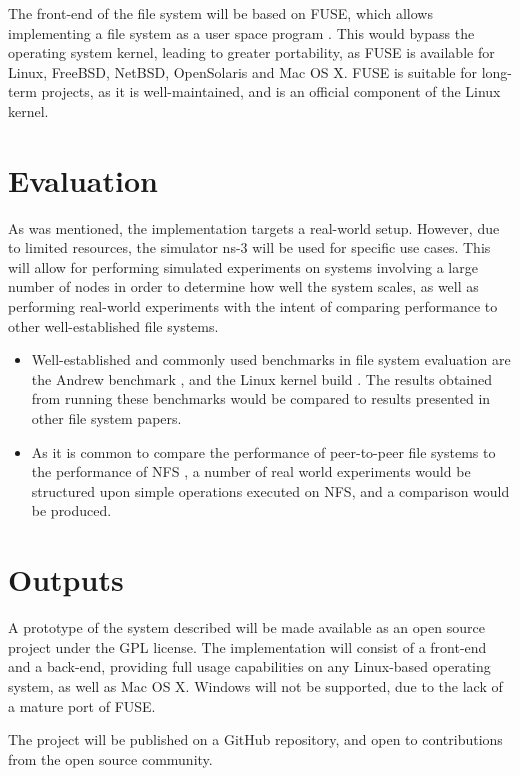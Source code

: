 \documentclass[8pt,a4paper]{article}
\begin{document}
The front-end of the file system will be based on FUSE, which allows implementing a file system as a user space program \cite{fuse}. This would bypass the operating system kernel, leading to greater portability, as FUSE is available for Linux, FreeBSD, NetBSD, OpenSolaris and Mac OS X. FUSE is suitable for long-term projects, as it is well-maintained, and is an official component of the Linux kernel.

\section{Evaluation}

As was mentioned, the implementation targets a real-world setup. However, due to limited resources, the simulator ns-3 \cite{ns3} will be used for specific use cases. This will allow for performing simulated experiments on systems involving a large number of nodes in order to determine how well the system scales, as well as performing real-world experiments with the intent of comparing performance to other well-established file systems.

\begin{itemize}
\item Well-established and commonly used benchmarks in file system evaluation are the Andrew benchmark \cite{andrew}, and the Linux kernel build \cite{kernelb}. The results obtained from running these benchmarks would be compared to results presented in other file system papers.

\item As it is common to compare the performance of peer-to-peer file systems to the performance of NFS \cite{oceanstore} \cite{ivy} \cite{pastis}, a number of real world experiments would be structured upon simple operations executed on NFS, and a comparison would be produced.
\end{itemize}

\section{Outputs}

A prototype of the system described will be made available as an open source project under the GPL \cite{gpl} license. The implementation will consist of a front-end and a back-end, providing full usage capabilities on any Linux-based operating system, as well as Mac OS X. Windows will not be supported, due to the lack of a mature port of FUSE. 

The project will be published on a GitHub \cite{github} repository, and open to contributions from the open source community.
\end{document}
